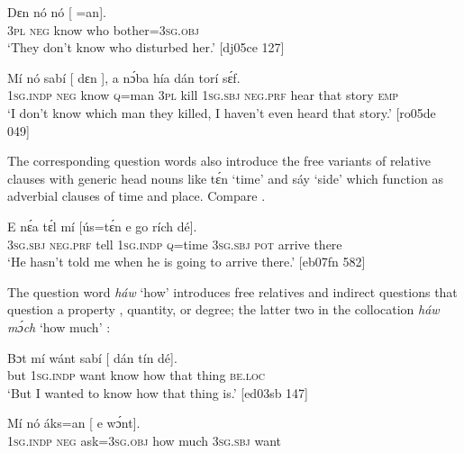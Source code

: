 \ea%
    \label{ex:key:1451}
    \gll Dɛn  nó  nó    [  =an].\\
\textsc{3pl}  \textsc{neg}  know   who  bother=\textsc{3sg.obj}\\

\glt ‘They don’t know who disturbed her.’ [dj05ce 127]
\z


\ea%
    \label{ex:key:1452}
    \gll Mí    nó  sabí    [  dɛn  ],    a    nɔ́ba  hía
dán    torí    sɛ́f.\\
\textsc{1sg.indp}  \textsc{neg}  know   \textsc{q}=man  \textsc{3pl}  kill    \textsc{1sg.sbj}  \textsc{neg}.\textsc{prf}  hear
that    story  \textsc{emp}\\

\glt ‘I don’t know which man they killed, I haven’t even heard that 
story.’ [ro05de 049]
\z

The corresponding question words also introduce the free variants of relative clauses with generic head nouns like tɛ́n ‘time’ and sáy ‘side’ which function as adverbial clauses of time and place. Compare . 


\ea%
    \label{ex:key:1453}
    \gll E    nɛ́a    tɛ́l  mí    [ús=tɛ́n  e    go  rích    dé].\\
\textsc{3sg.sbj}  \textsc{neg}.\textsc{prf}  tell  \textsc{1sg.indp}   \textsc{q}=time  \textsc{3sg.sbj}  \textsc{pot}  arrive  there\\

\glt ‘He hasn’t told me when he is going to arrive there.’ [eb07fn 582]
\z

The question word \textit{háw} ‘how’ introduces free relatives and indirect questions that question a property , quantity, or degree; the latter two in the collocation \textit{háw mɔ́ch} ‘how much’ :


\ea%
    \label{ex:key:1454}
    \gll Bɔt  mí    wánt  sabí    [  dán    tín    dé].\\
but  \textsc{1sg.indp}  want  know   how  that    thing  \textsc{be.loc}\\

\glt ‘But I wanted to know how that thing is.’ [ed03sb 147]
\z


\ea%
    \label{ex:key:1455}
    \gll Mí    nó  áks=an    [    e    wɔ́nt].\\
\textsc{1sg.indp}  \textsc{neg}  ask=\textsc{3sg.obj}   how  much  \textsc{3sg.sbj}  want\\


